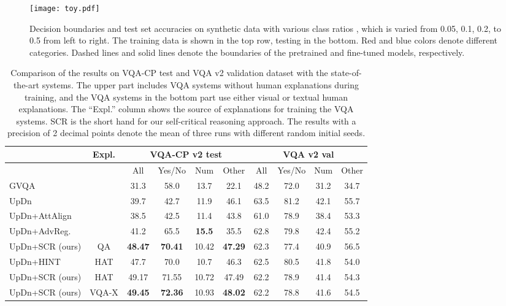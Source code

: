 \documentclass{article}
\begin{document}
\begin{figure}[!t]
    \centering
    \texttt{[image: toy.pdf]}
    \caption{Decision boundaries and test set accuracies on synthetic data with various class ratios , which is varied from 0.05, 0.1, 0.2, to 0.5 from left to right. The training data is shown in the top row, testing in the bottom. Red and blue colors denote different categories. Dashed lines and solid lines denote the boundaries of the pretrained and fine-tuned models, respectively.}
    \label{fig:toy}
\end{figure}



\begin{table}[!t]
\centering
\begin{tabular}{l|c|cccc|cccc}
\hline \toprule
                    & Expl. & \multicolumn{4}{c}{VQA-CP v2 test} & \multicolumn{4}{|c}{VQA v2 val} \\    \hline
              &       & {\footnotesize All}     & {\footnotesize Yes/No} &  {\footnotesize Num } & {\footnotesize Other} &  {\footnotesize All}   & {\footnotesize Yes/No} &  {\footnotesize Num}  &  {\footnotesize Other} \\ \hline\hline
GVQA\cite{vqa-cp}          &       &  31.3   &  58.0  & 13.7  & 22.1  &  48.2   &  72.0  & 31.2  & 34.7 \\
UpDn    \cite{anderson2017bottom}            &       &  39.7   &  42.7  & 11.9  & 46.1  &  63.5   &  81.2  & 42.1  & 55.7 \\
UpDn+AttAlign \cite{selvaraju2019taking}    &       &  38.5   &  42.5  & 11.4  & 43.8  &  61.0   &  78.9  & 38.4  & 53.3 \\
UpDn+AdvReg.    \cite{ramakrishnan2018overcoming}    &       &  41.2   &  65.5  & \textbf{15.5}  & 35.5  &  62.8   &  79.8  & 42.4  & 55.2 \\
UpDn+SCR (ours)   & {\footnotesize  QA}   &  \textbf{48.47}   &  \textbf{70.41}  & 10.42  & \textbf{47.29}  &  62.3   &  77.4  & 40.9  & 56.5     \\ \hline
UpDn+HINT   \cite{selvaraju2019taking}        & {\footnotesize  HAT}  &  47.7   &  70.0  & 10.7  & 46.3  &  62.5   &  80.5  & 41.8  & 54.0 \\
UpDn+SCR (ours)   & {\footnotesize  HAT}  &  49.17   &  71.55  & 10.72  & 47.49  &  62.2   &  78.9  & 41.4  & 54.3  \\
UpDn+SCR (ours)   &{\footnotesize VQA-X} &  \textbf{49.45} &  \textbf{72.36}  & 10.93  & \textbf{48.02}  &  62.2   &  78.8  & 41.6  & 54.5   \\\bottomrule
\end{tabular}
\caption{Comparison of the results on VQA-CP test and VQA v2 validation dataset with the state-of-the-art systems. The upper part includes VQA systems without human explanations during training, and the VQA systems in the bottom part use either visual or textual human explanations. The ``Expl.'' column shows the source of explanations for training the VQA systems. SCR is the short hand for our self-critical reasoning approach. The results with a precision of 2 decimal points denote the mean of three runs with different random initial seeds.}
\label{tab:vqa_compare}
\end{table}
\end{document}
